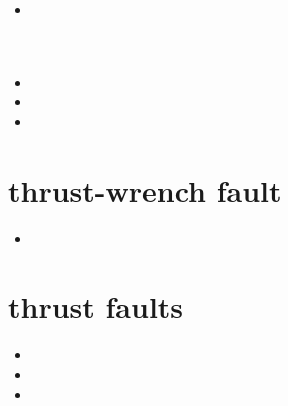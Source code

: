 \begin{small}
\begin{itemize}
\\
\\
 \\
 \\
 \\
\item[\twothousandtwentyone] 
 \\
 \\
 \\
\item[\twothousandtwentytwo]
\item[\twothousandtwentythree]
\item[\twothousandtwentyfour]
\end{itemize}
\end{small}

\section{thrust-wrench fault} 

\begin{small}
\begin{itemize}
\item[\twothousandfifteen] 
\end{itemize}
\end{small}

\section{thrust faults} 

\begin{small}
\begin{itemize}
\item[\nineteenninety] 
\item[\nineteenninetytwo] 
\item[\twothousandfourteen] 
\end{itemize}
\end{small}

